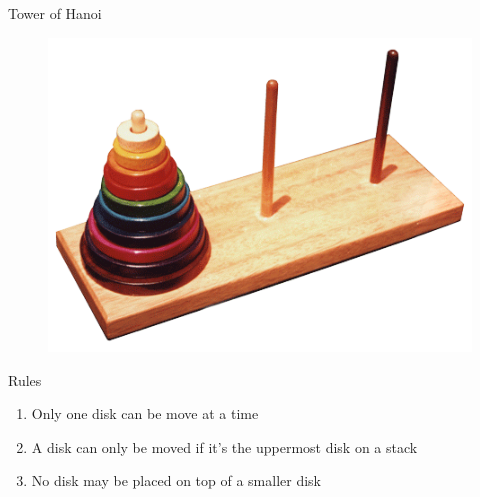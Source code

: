 \documentclass{beamer}
\begin{document}
\begin{frame}[fragile]{Tower of Hanoi}
  \begin{figure}
    \includegraphics[scale=0.3]{hanoi}
  \end{figure}

  \begin{block}{Rules}
    \begin{enumerate}
    \item Only one disk can be move at a time
    \item A disk can only be moved if it's the uppermost disk on a stack
    \item No disk may be placed on top of a smaller disk
    \end{enumerate}
  \end{block}
\end{frame}
\end{document}
